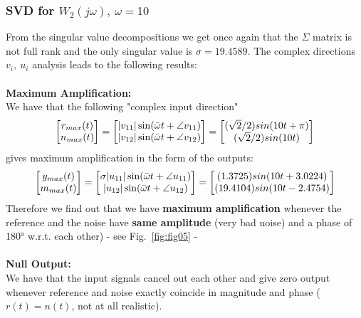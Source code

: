 \documentclass[a4paper, 12pt]{article}
\begin{document}
\subsubsection{SVD for $W_2(j\omega),\ \omega=10$}
From the singular value decompositions we get once again that the $\Sigma$ matrix is not full rank and the only singular value is $\sigma= 19.4589$. 
The complex directions $v_i,\ u_i$ analysis leads to the following results:\\\\
\textbf{Maximum Amplification:} \\We have that the following "complex input direction"
\begin{equation*}
\begin{bmatrix}
r_{max}(t) \\ n_{max}(t)
\end{bmatrix} =
\begin{bmatrix}|v_{11}|\sin(\Bar{\omega}  t + \angle v_{11}) \\ |v_{12}|\sin(\Bar{\omega}  t + \angle v_{12}) \end{bmatrix} =
\begin{bmatrix}
(\sqrt{2}/2)sin(10 t+\pi) \\
(\sqrt{2}/2)sin(10 t)
\end{bmatrix}
\end{equation*}
gives maximum amplification in the form of the outputs:
\begin{equation*}
\begin{bmatrix}
y_{max}(t) \\ m_{max}(t)
\end{bmatrix} =
\begin{bmatrix}\sigma|u_{11}|\sin(\Bar{\omega}  t + \angle u_{11}) \\ |u_{12}|\sin(\Bar{\omega}  t + \angle u_{12}) \end{bmatrix} =
\begin{bmatrix}
(1.3725)sin(10 t + 3.0224) \\
(19.4104)sin(10 t -2.4754)
\end{bmatrix}
\end{equation*}
Therefore we find out that we have \textbf{maximum amplification} whenever the reference and the noise have \textbf{same amplitude} (very bad noise) and a phase of 180° w.r.t. each other) - see Fig.~\ref{fig:fig05} -\\\\
\textbf{Null Output:} \\We have that the input signals cancel out each other and give zero output whenever reference and noise exactly coincide in magnitude and phase ($r(t) = n(t)$, not at all realistic).
\end{document}
